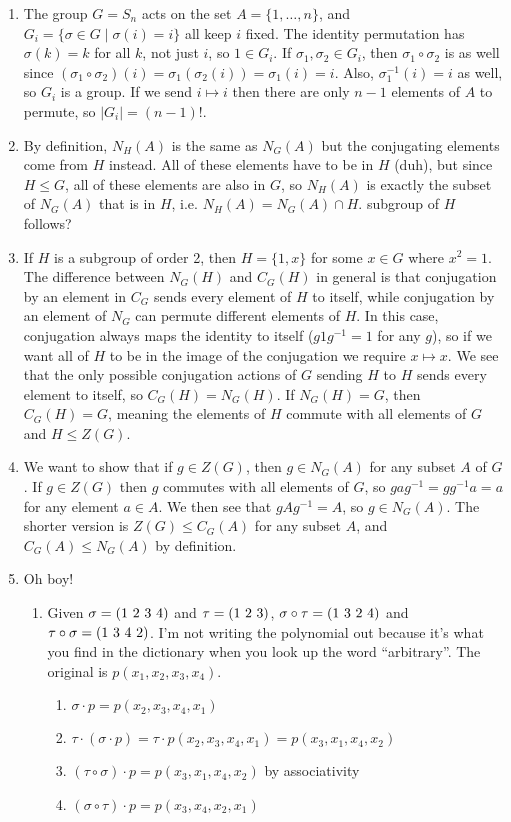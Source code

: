 \documentclass[]{article}
\newcommand{\abs}[1]{\left\vert #1 \right\vert}
\newcommand*{\cycle}[1]{( \foreach \entry [count=\i] in {#1} {\ifnum\i>1\ \fi\entry})}
\begin{document}
\begin{enumerate}
\item The group $G = S_n$ acts on the set $A = \{1,\ldots ,n\}$, and $G_i = \{ \sigma\in G \mid \sigma (i) = i \}$ all keep $i$ fixed. The identity permutation has $\sigma(k) = k$ for all $k$, not just $i$, so $1 \in G_i$. If $\sigma_1, \sigma_2 \in G_i$, then $\sigma_1 \circ \sigma_2$ is as well since $(\sigma_1\circ \sigma_2)(i) = \sigma_1(\sigma_2(i)) = \sigma_1(i) = i$. Also, $\sigma_1^{-1}(i) = i$ as well, so $G_i$ is a group. If we send $i \mapsto i$ then there are only $n-1$ elements of $A$ to permute, so $\abs{G_i} = (n-1)!$.


\item By definition, $N_H(A)$ is the same as $N_G(A)$ but the conjugating elements come from $H$ instead. All of these elements have to be in $H$ (duh), but since $H \leq G$, all of these elements are also in $G$, so $N_H(A)$ is exactly the subset of $N_G(A)$ that is in $H$, i.e. $N_H(A) = N_G(A) \cap H$. {\color{red} subgroup of $H$ follows?}


\item If $H$ is a subgroup of order 2, then $H = \{1, x\}$ for some $x\in G$ where $x^2 = 1$. The difference between $N_G(H)$ and $C_G(H)$ in general is that conjugation by an element in $C_G$ sends every element of $H$ to itself, while conjugation by an element of $N_G$ can permute different elements of $H$. In this case, conjugation always maps the identity to itself ($g1g^{-1} = 1$ for any $g$), so if we want all of $H$ to be in the image of the conjugation we require $x \mapsto x$. We see that the only possible conjugation actions of $G$ sending $H$ to $H$ sends every element to itself, so $C_G(H) = N_G(H)$. If $N_G(H) = G$, then $C_G(H) = G$, meaning the elements of $H$ commute with all elements of $G$ and $H \leq Z(G)$. 


\item We want to show that if $g \in Z(G)$, then $g \in N_G(A)$ for any subset $A$ of $G$. If $g \in Z(G)$ then $g$ commutes with all elements of $G$, so $gag^{-1} = gg^{-1}a = a$ for any element $a \in A$. We then see that $gAg^{-1} = A$, so $g \in N_G(A)$. The shorter version is $Z(G) \leq C_G(A)$ for any subset $A$, and $C_G(A) \leq N_G(A)$ by definition.


\item Oh boy!
\begin{enumerate}
\item Given $\sigma = \cycle{1,2,3,4}$ and $\tau = \cycle{1,2,3}$, $\sigma\circ\tau = \cycle{1,3,2,4}$ and $\tau\circ\sigma = \cycle{1,3,4,2}$. I'm not writing the polynomial out because it's what you find in the dictionary when you look up the word ``arbitrary''. The original is $p(x_1,x_2,x_3,x_4)$.
\begin{enumerate}
\item $\sigma\cdot p = p(x_2,x_3,x_4,x_1)$
\item $\tau\cdot (\sigma\cdot p) = \tau\cdot p(x_2,x_3,x_4,x_1) = p(x_3,x_1,x_4,x_2)$
\item $(\tau\circ\sigma)\cdot p = p(x_3,x_1,x_4,x_2)$ by associativity
\item $(\sigma\circ\tau)\cdot p = p(x_3,x_4,x_2,x_1)$
\end{enumerate}


\end{enumerate}
\end{enumerate}
\end{document}
